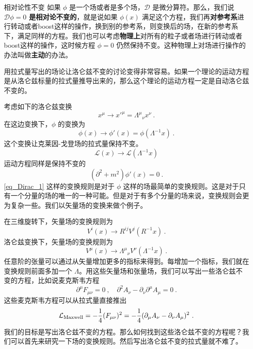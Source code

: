 
\begin{definition}{相对论性不变}
如果 $\phi$ 是一个场或者是多个场，$\mathcal D$ 是微分算符。那么，我们说\textbf{$\mathcal D \phi = 0$ 是相对论不变的}，就是说如果 $\phi(x)$ 满足这个方程，我们再\textbf{对参考系}进行转动或者boost这样的操作，换到别的参考系，则变换后的场，在新的参考系下，满足同样的方程。我们也可以考虑\textbf{物理上}对所有的粒子或者场进行转动或者boost这样的操作，这时候方程 $\mathcal\phi = 0$ 仍然保持不变。这种物理上对场进行操作的办法叫做\textbf{主动}的办法。
\end{definition}
用拉式量写出的场论让洛仑兹不变的讨论变得非常容易。如果一个理论的运动方程是从洛仑兹标量的拉式量推导出来的，那么这个理论的运动方程一定是自动洛仑兹不变的。

考虑如下的洛仑兹变换
\begin{equation}
x^\mu \rightarrow x'^\mu = \Lambda^\mu{}_\nu x^\nu ~. 
\end{equation}
在这边变换下，$\phi$ 的变换为
\begin{equation}\label{eq_Dirac_1}
\phi(x)\rightarrow \phi'(x)=\phi(\Lambda^{-1}x)~.
\end{equation}
这个变换让克莱因-戈登场的拉式量保持不变。
\begin{equation}
\mathcal L(x)\rightarrow \mathcal L(\Lambda^{-1}x)
\end{equation}
运动方程同样是保持不变的
\begin{equation}
(\partial^2+m^2)\phi'(x) = 0 ~.
\end{equation}
\autoref{eq_Dirac_1} 这样的变换规则是对于 $\phi$ 这样的场最简单的变换规则。这是对于只有一个分量的场的唯一的一种可能。但是对于有多个分量的场来说，变换规则会更为复杂一些。我们以矢量场的变换来做个例子。

在三维旋转下，矢量场的变换规则为
\begin{equation}
V^i(x) \rightarrow R^{ij} V^j (R^{-1}x)~.
\end{equation}
洛仑兹变换下，矢量场的变换规则为
\begin{equation}
V^\mu(x) \rightarrow \Lambda^\mu{}_{\nu}V^\nu(\Lambda^{-1}x)~.
\end{equation}
任意阶的张量可以通过从矢量增加更多的指标来得到。每增加一个指标，我们就在变换规则前面多加一个 $\Lambda$。用这些矢量场和张量场，我们可以写出一些洛仑兹不变的方程，比如说麦克斯韦方程
\begin{equation}
\partial^\mu F_{\mu\nu} = 0~,\quad \partial^2 A_\nu -\partial_\nu \partial^\mu A_\mu = 0~.  
\end{equation}
这些麦克斯韦方程可以从拉式量直接推出
\begin{equation}
\mathcal L_{\rm Maxwell} = - \frac{1}{4} (F_{\mu\nu})^2 = - \frac{1}{4} (\partial_\mu A_\nu - \partial_\nu A_\mu)^2~. 
\end{equation}
我们的目标是写出洛仑兹不变的方程。那么如何找到这些洛仑兹不变的方程呢？我们可以首先来研究一下场的变换规则。然后写出洛仑兹不变的拉式量就不难了。

